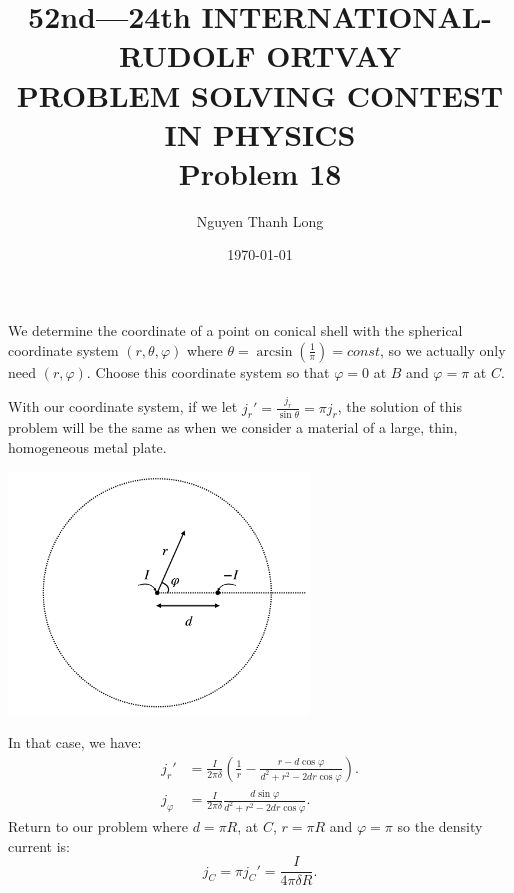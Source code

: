 \documentclass[12pt]{article}
\title{52nd—24th INTERNATIONAL-RUDOLF ORTVAY \\ PROBLEM SOLVING CONTEST IN PHYSICS \\ Problem 18}
\author{Nguyen Thanh Long}
\date{\today}
\begin{document}
	
\maketitle

\noindent We determine the coordinate of a point on conical shell with the spherical coordinate system $(r, \theta, \varphi)$ where $\theta = \arcsin \left( \frac{1}{\pi} \right) = const$, so we actually only need $(r, \varphi)$. Choose this coordinate system so that $\varphi = 0$ at $B$ and $\varphi = \pi$ at $C$.

\noindent With our coordinate system, if we let $j_{r}' = \frac{ j_{r} }{ \sin \theta } = \pi j_r$, the solution of this problem will be the same as when we consider a material of a large, thin, homogeneous metal plate.

\begin{center}
	\includegraphics[width=0.6\textwidth]{Fig P18.png}
\end{center}	

\noindent In that case, we have:
\begin{align*}
	j_r' & = \frac{I}{2 \pi  \delta} \left( \frac{1}{r} - \frac{r - d \cos \varphi}{ d^2 + r^2 - 2 d r \cos \varphi } \right) . \\
	j_{\varphi} & = \frac{I}{2 \pi \delta} \frac{ d \sin \varphi }{d^2 + r^2 - 2 d r \cos \varphi} .
\end{align*}	
\noindent Return to our problem where $d = \pi R$, at $C$, $r = \pi R$ and $\varphi = \pi$ so the density current is: 
$$ j_C = \pi j_C' = \frac{I}{4 \pi \delta R} .$$
	
	
\end{document}
